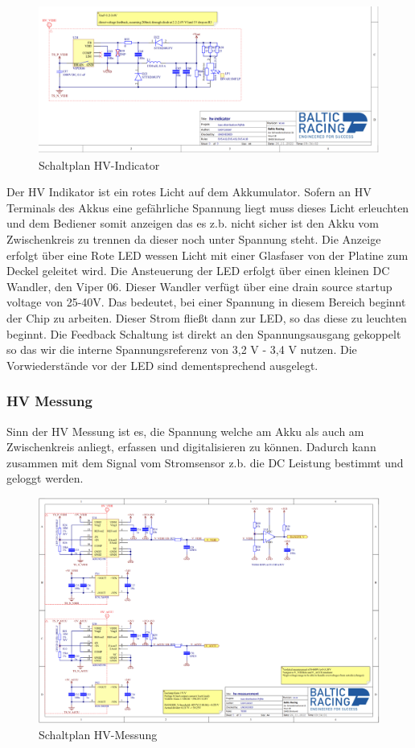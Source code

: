 \begin{figure}
	\centering
	\includegraphics[width=0.7\linewidth]{bilder/HV_indicator_schematic}
	\caption{Schaltplan \ac{HV}-Indicator}
	\label{fig:hvindicatorschematic}
\end{figure}

Der \ac{HV} Indikator ist ein rotes Licht auf dem Akkumulator. Sofern an \ac{HV} Terminals des Akkus eine gefährliche Spannung liegt muss dieses Licht erleuchten und dem Bediener somit anzeigen das es z.b. nicht sicher ist den Akku vom Zwischenkreis zu trennen da dieser noch unter Spannung steht. Die Anzeige erfolgt über eine Rote LED wessen Licht mit einer Glasfaser von der Platine zum Deckel geleitet wird. Die Ansteuerung der LED erfolgt über einen kleinen DC Wandler, den Viper 06. Dieser Wandler verfügt über eine drain source startup voltage von 25-40V. Das bedeutet, bei einer Spannung in diesem Bereich beginnt der Chip zu arbeiten. Dieser Strom fließt dann zur LED, so das diese zu leuchten beginnt. Die Feedback Schaltung ist direkt an den Spannungsausgang gekoppelt so das wir die interne Spannungsreferenz von 3,2 V - 3,4 V nutzen. Die Vorwiederstände vor der LED sind dementsprechend ausgelegt.

\FloatBarrier
\subsubsection{\ac{HV} Messung}
Sinn der \ac{HV} Messung ist es, die Spannung welche am Akku als auch am Zwischenkreis anliegt, erfassen und digitalisieren zu können. Dadurch kann zusammen mit dem Signal vom Stromsensor z.b. die DC Leistung bestimmt und geloggt werden. 

\begin{figure}
	\centering
	\includegraphics[width=0.7\linewidth]{bilder/HV_Measurement_PNG}
	\caption{Schaltplan \ac{HV}-Messung}
	\label{fig:hvmeasurementpng}
\end{figure}

